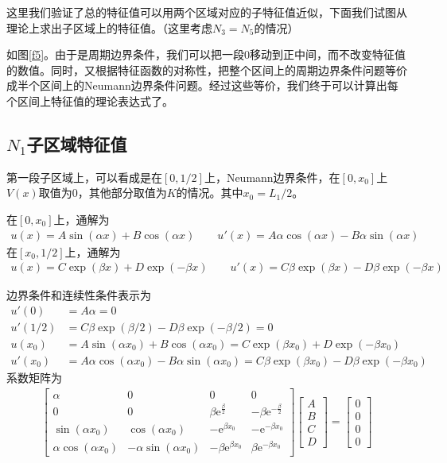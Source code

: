 \documentclass[12pt,a4paper]{article}
\begin{document}
这里我们验证了总的特征值可以用两个区域对应的子特征值近似，下面我们试图从理论上求出子区域上的特征值。（这里考虑$N_3=N_5$的情况）

如图\ref{f5}。由于是周期边界条件，我们可以把一段0移动到正中间，而不改变特征值的数值。同时，又根据特征函数的对称性，把整个区间上的周期边界条件问题等价成半个区间上的Neumann边界条件问题。经过这些等价，我们终于可以计算出每个区间上特征值的理论表达式了。

\subsection*{$N_1$子区域特征值}

第一段子区域上，可以看成是在$[0, 1/2]$上，Neumann边界条件，在$[0, x_0]$上$V(x)$取值为$0$，其他部分取值为$K$的情况。其中$x_0 = L_1/2$。

在$[0, x_0]$上，通解为
\begin{align*}
u(x) = A \sin(\alpha x) + B \cos(\alpha x) \qquad u'(x) = A \alpha \cos(\alpha x) - B \alpha \sin(\alpha x)
\end{align*}
在$[x_0, 1/2]$上，通解为
\begin{align*}
u(x) = C \exp(\beta x) + D \exp(-\beta x) \qquad u'(x) = C \beta \exp(\beta x) - D \beta \exp(-\beta x)
\end{align*}

边界条件和连续性条件表示为
\begin{align*}
u'(0) & = A \alpha = 0 \\
u'(1/2) & = C \beta \exp(\beta/2) - D \beta \exp(-\beta/2) = 0 \\
u(x_0) & = A \sin(\alpha x_0) + B \cos(\alpha x_0) = C \exp(\beta x_0) + D \exp(-\beta x_0) \\
u'(x_0) & = A \alpha \cos(\alpha x_0) - B \alpha \sin(\alpha x_0) = C \beta \exp(\beta x_0) - D \beta \exp(-\beta x_0)
\end{align*}
系数矩阵为
\begin{align*}
\left[\begin{array}{cccc} \alpha & 0 & 0 & 0\\ 0 & 0 & \beta \mathrm{e}^{\frac{\beta}{2}} & - \beta \mathrm{e}^{-\frac{\beta}{2}}\\ \sin\!\left(\alpha x_0\right) & \cos\!\left(\alpha x_0\right) & - \mathrm{e}^{\beta x_0} & - \mathrm{e}^{- \beta x_0}\\ \alpha \cos\!\left(\alpha x_0\right) & - \alpha \sin\!\left(\alpha x_0\right) & - \beta \mathrm{e}^{\beta x_0} & \beta \mathrm{e}^{- \beta x_0} \end{array}\right]
\left[\begin{array}{c} A \\ B \\ C \\ D \end{array}\right]
=
\left[\begin{array}{c} 0 \\ 0 \\ 0 \\ 0 \end{array}\right]
\end{align*}
\end{document}
